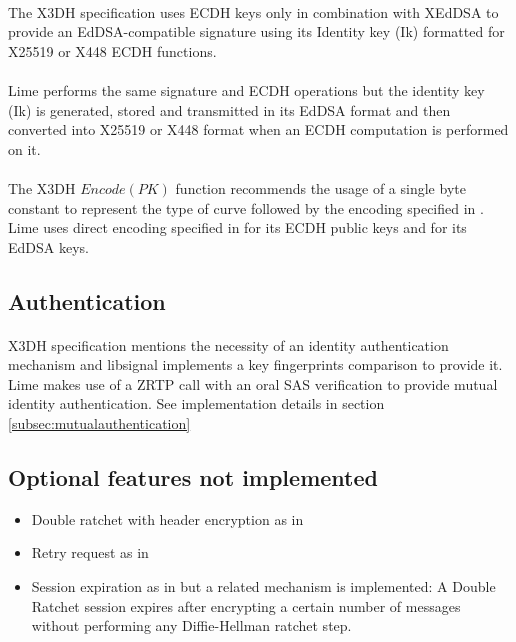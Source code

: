 \documentclass[a4paper,11pt]{article}
\begin{document}
    \paragraph{}The X3DH specification uses ECDH keys only in combination with XEdDSA\cite{xeddsa} to provide an EdDSA-compatible signature using its Identity key (Ik) formatted for X25519 or X448 ECDH functions.
    \paragraph{}Lime performs the same signature and ECDH operations but the identity key (Ik) is generated, stored and transmitted in its EdDSA format and then converted into X25519 or X448 format when an ECDH computation is performed on it.
    \paragraph{}The X3DH $Encode(PK)$ function recommends the usage of a single byte constant to represent the type of curve followed by the encoding specified in \cite{rfc7748}. Lime uses direct encoding specified in \cite{rfc7748} for its ECDH public keys and \cite{rfc8032} for its EdDSA keys.

  \subsection{Authentication}
  \paragraph*{}X3DH specification mentions \cite[section 4.1]{x3dh} the necessity of an identity authentication mechanism and libsignal\cite{libsignal} implements a key fingerprints comparison to provide it. Lime makes use of a ZRTP\cite{zrtp} call with an oral SAS verification to provide mutual identity authentication. See implementation details in section \ref{subsec:mutualauthentication}
  \subsection{Optional features not implemented}
    \begin{itemize}
      \item Double ratchet with header encryption as in \cite[section 4]{doubleRatchet}
      \item Retry request as in \cite[section 4.1]{sesame}
      \item Session expiration as in \cite[section 4.2]{sesame} but a related mechanism is implemented: A Double Ratchet session expires after encrypting a certain number of messages without performing any Diffie-Hellman ratchet step.
    \end{itemize}
\end{document}
